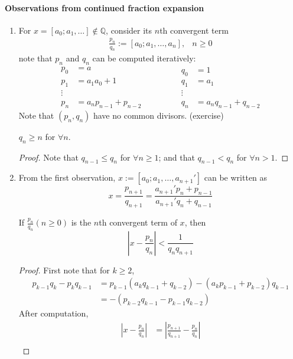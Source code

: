 \paragraph{Observations from continued fraction expansion}
\begin{enumerate}
\item
For $x=[a_0;a_1,\dots]\notin\mathbb{Q}$, consider its $n$th convergent term
\[
\begin{array}{ll}
\frac{p_n}{q_n}:=[a_0;a_1,\dots,a_n],
&
n\ge0
\end{array}
\]
note that $p_n$ and $q_n$ can be computed iteratively:
\[
\begin{aligned}
p_0&=a\\
p_1&=a_1a_0+1\\
\vdots\\
p_n&=a_np_{n-1}+p_{n-2}
\end{aligned}
\qquad\qquad
\begin{aligned}
q_0&=1\\
q_1&=a_1\\
\vdots\\
q_n&=a_nq_{n-1}+q_{n-2}
\end{aligned}
\]
Note that $(p_n,q_n)$ have no common divisors. (exercise)
\begin{corollary}
$q_n\ge n$ for $\forall n$.
\end{corollary}
\begin{proof}
Note that $q_{n-1}\le q_n$ for $\forall n\ge1$; and that $q_{n-1}<q_n$ for $\forall n>1$.
\end{proof}
\item
From the first observation, $x:=[a_0;a_1,\dots,a_{n+1}']$ can be written as
\[
x=\frac{p_{n+1}}{q_{n+1}}=\frac{a_{n+1}'p_n + p_{n-1}}{a_{n+1}'q_n+q_{n-1}}
\]
\begin{corollary}
If $\frac{p_n}{q_n} (n\ge0)$ is the $n$th convergent term of $x$, then
\[
\left|
x-\frac{p_n}{q_n}
\right|<\frac{1}{q_{n}q_{n+1}}
\]
\end{corollary}
\begin{proof}
First note that for $k\ge2$,
\begin{align*}
p_{k-1}q_k-p_kq_{k-1}&=p_{k-1}(a_kq_{k-1}+q_{k-2})
-(a_kp_{k-1}+p_{k-2})q_{k-1}\\
&=-(p_{k-2}q_{k-1}-p_{k-1}q_{k-2})
\end{align*}
After computation,
\begin{align*}
\left|
x-\frac{p_n}{q_n}
\right|&=\left|\frac{p_{n+1}}{q_{n+1}}-\frac{p_n}{q_n}\right|\\

\end{align*}
\end{proof}
\end{enumerate}
